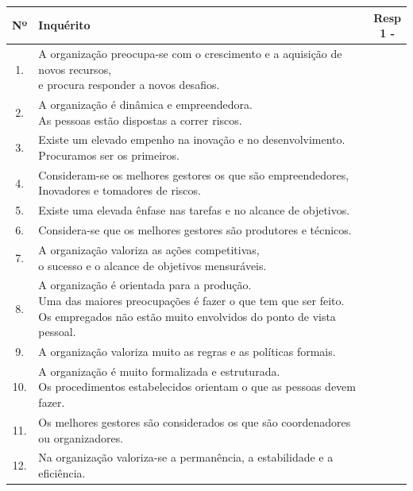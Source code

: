\begin{table}[h!]
	\begin{adjustbox}{max width=\textwidth}
		\begin{tabular}{ |c|l|c| }
			\hline
			\rowcolor[gray]{0.5}
			Nº & Inquérito & \makecell[l]{Resp \\ 1 \; - \; 7} \\
			\hline
			1. & \makecell[l]{A organização preocupa-se com o crescimento e a aquisição de novos recursos, \\ e procura responder a novos desafios.} & \\
			\hline
			2. & \makecell[l]{A organização é dinâmica e empreendedora. \\ As pessoas estão dispostas a correr riscos.} & \\
			\hline
			3. & \makecell[l]{Existe um elevado empenho na inovação e no desenvolvimento. \\ Procuramos ser os primeiros.} & \\
			\hline
			4. & \makecell[l]{Consideram-se os melhores gestores os que são empreendedores, \\ Inovadores e tomadores de riscos.} & \\
			\hline
			5. & Existe uma elevada ênfase nas tarefas e no alcance de objetivos. & \\
			\hline
			6. & Considera-se que os melhores gestores são produtores e técnicos. & \\
			\hline
			7. & \makecell[l]{A organização valoriza as ações competitivas, \\ o sucesso e o alcance de objetivos mensuráveis.} & \\
			\hline
			8. & \makecell[l]{A organização é orientada para a produção. \\ Uma das maiores preocupações é fazer o que tem que ser feito. \\ Os empregados não estão muito envolvidos do ponto de vista pessoal.} & \\
			\hline
			9. & A organização valoriza muito as regras e as políticas formais. & \\
			\hline
			10. & \makecell[l]{A organização é muito formalizada e estruturada. \\ Os procedimentos estabelecidos orientam o que as pessoas devem fazer.} & \\
			\hline
			11. & Os melhores gestores são considerados os que são coordenadores ou organizadores. & \\
			\hline
			12. & Na organização valoriza-se a permanência, a estabilidade e a eficiência. & \\

\end{tabular}
\end{adjustbox}
\end{table}
